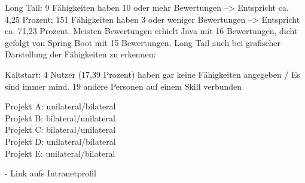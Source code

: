 Long Tail: 9 Fähigkeiten haben 10 oder mehr Bewertungen --> Entspricht ca. 4,25 Prozent; 151 Fähigkeiten haben 3 oder weniger Bewertungen --> Entspricht ca. 71,23 Prozent. Meisten Bewertungen erhielt Java mit 16 Bewertungen, dicht gefolgt von Spring Boot mit 15 Bewertungen. Long Tail auch bei grafischer Darstellung der Fähigkeiten zu erkennen:



Kaltstart: 4 Nutzer (17,39 Prozent) haben gar keine Fähigkeiten angegeben / Es sind immer mind. 19 andere Personen auf einem Skill verbunden

\newpage
Projekt A: unilateral/bilateral\\
Projekt B: bilateral/unilateral\\
Projekt C: bilateral/unilateral\\
Projekt D: unilateral/bilateral\\
Projekt E: unilateral/bilateral

- Link aufs Intranetprofil

